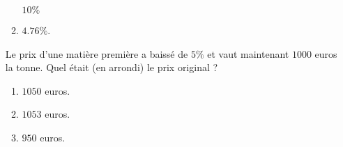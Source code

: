 \begin{exercice}
\begin{multicols}{3}
\begin{enumerate}
\begin{enumerate}
                \( 10\%\)
            \item
                \( 4.76\%\).
        \end{enumerate}
        Le prix d'une matière première a baissé de \( 5\%\) et vaut maintenant \( 1000\) euros la tonne. Quel était (en arrondi) le prix original ?
        \begin{enumerate}
            \item
                \( 1050\) euros.
            \item
                \( 1053\) euros.
            \item
                \( 950\) euros.
        \end{enumerate}
    \end{enumerate}
    \end{multicols}
        
\end{exercice}
